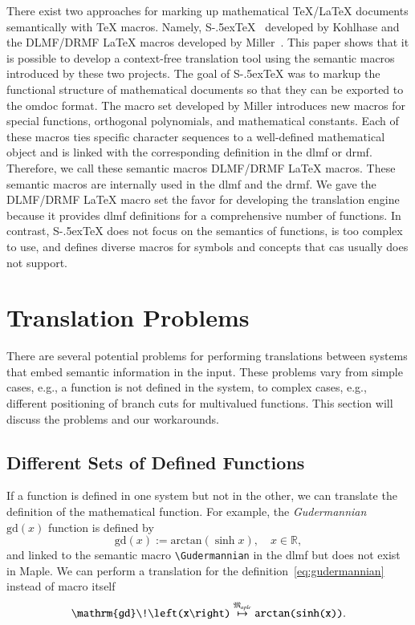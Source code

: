 \documentclass[a4paper,11pt]{article}
\newcommand{\DLMF}{DLMF}
\newcommand{\DRMF}{DRMF}
\newcommand{\Maple}{Maple}
\newcommand{\Macro}{\DLMF/\DRMF{} \LaTeX{} macro}
\newcommand{\langMaple}{\mathfrak{M}_{aple}}
\newcommand{\sTeX}{{\raisebox{-.5ex}S\kern-.5ex\TeX}}
\theoremstyle{defTheoStyle}
\theoremstyle{defExampStyle}
\DeclareRobustCommand{\Real}{\mathbb{R}}
\newcommand{\Gudermannian}[1]{\mathrm{gd}\!\left(#1\right)}
\newcommand{\atan}[1]{\mathrm{arctan}\!\left(#1\right)}
\begin{document}
There exist two approaches for marking up mathematical \TeX/\LaTeX{} documents semantically with \TeX{} macros. Namely, \sTeX{}~\parencite{sTeX} developed by Kohlhase and the \Macro s developed by Miller~\parencite{DLMF:Macros}. This paper shows that it is possible to develop a context-free translation tool using the semantic macros introduced by these two projects. The goal of \sTeX{} was to markup the functional structure of mathematical documents so that they can be exported to the \gls*{omdoc} format. The macro set developed by Miller introduces new macros for special functions, orthogonal polynomials, and mathematical constants. Each of these macros ties specific character sequences to a well-defined mathematical object and is linked with the corresponding definition in the \gls*{dlmf} or \gls*{drmf}. Therefore, we call these semantic macros \Macro s. These semantic macros are internally used in the \gls*{dlmf} and the \gls*{drmf}. We gave the \Macro{} set the favor for developing the translation engine because it provides \gls*{dlmf} definitions for a comprehensive number of functions. In contrast, \sTeX{} does not focus on the semantics of functions, is too complex to use, and defines diverse macros for symbols and concepts that \gls*{cas} usually does not support.

\section{Translation Problems}\label{sec:problems}
There are several potential problems for performing translations between systems that embed semantic information in the input. These problems vary from simple cases, e.g., a function is not defined in the system, to complex cases, e.g., different positioning of branch cuts for multivalued functions. This section will discuss the problems and our workarounds.

\subsection{Different Sets of Defined Functions}
If a function is defined in one system but not in the other, we can translate the definition of the mathematical function. For example, the \textit{Gudermannian}~\parencite[(4.23.10)]{NIST:DLMF} $\Gudermannian{x}$ function is defined by
\begin{equation}\label{eq:gudermannian}
\Gudermannian{x} := \atan{\sinh{x}}, \quad x \in \Real,
\end{equation}
and linked to the semantic macro \verb|\Gudermannian| in the \gls*{dlmf} but does not exist in \Maple. We can perform a translation for the definition~\eqref{eq:gudermannian} instead of macro itself
\begin{equation}\label{eq:guder-trans}
\verb|\Gudermannian{x}| \overset{\langMaple}{\mapsto} \texttt{arctan(sinh(x))}.
\end{equation}
\end{document}

